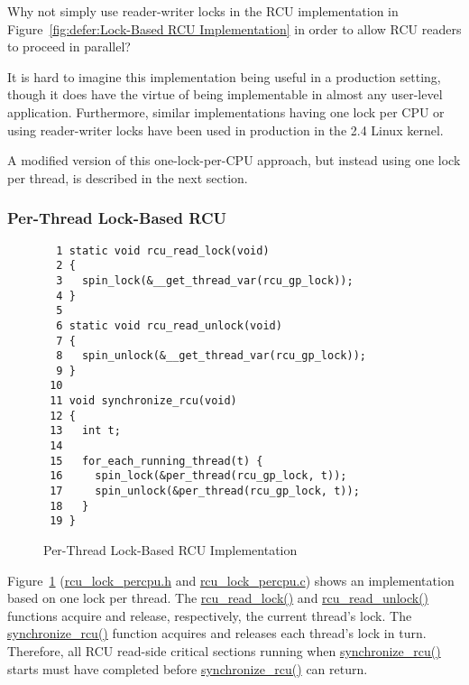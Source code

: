 \QuickQuiz{}
	Why not simply use reader-writer locks in the RCU implementation
	in
	Figure~\ref{fig:defer:Lock-Based RCU Implementation}
	in order to allow RCU readers to proceed in parallel?
 \QuickQuizEnd

It is hard to imagine this implementation being useful
in a production setting, though it does have the virtue
of being implementable in almost any user-level application.
Furthermore, similar implementations having one lock per CPU
or using reader-writer locks have been used in production
in the 2.4 Linux kernel.

A modified version of this one-lock-per-CPU approach, but instead using
one lock per thread, is described
in the next section.

\subsubsection{Per-Thread Lock-Based RCU}
\label{defer:Per-Thread Lock-Based RCU}

\begin{figure}[bp]
{ \scriptsize
\begin{verbatim}
  1 static void rcu_read_lock(void)
  2 {
  3   spin_lock(&__get_thread_var(rcu_gp_lock));
  4 }
  5
  6 static void rcu_read_unlock(void)
  7 {
  8   spin_unlock(&__get_thread_var(rcu_gp_lock));
  9 }
 10
 11 void synchronize_rcu(void)
 12 {
 13   int t;
 14
 15   for_each_running_thread(t) {
 16     spin_lock(&per_thread(rcu_gp_lock, t));
 17     spin_unlock(&per_thread(rcu_gp_lock, t));
 18   }
 19 }
\end{verbatim}
}
\caption{Per-Thread Lock-Based RCU Implementation}
\label{fig:defer:Per-Thread Lock-Based RCU Implementation}
\end{figure}

Figure~\ref{fig:defer:Per-Thread Lock-Based RCU Implementation}
(\url{rcu_lock_percpu.h} and \url{rcu_lock_percpu.c})
shows an implementation based on one lock per thread.
The \url{rcu_read_lock()} and \url{rcu_read_unlock()} functions
acquire and release, respectively, the current thread's lock.
The \url{synchronize_rcu()} function acquires and releases each thread's
lock in turn.
Therefore, all RCU read-side critical sections running
when \url{synchronize_rcu()} starts must have completed before
\url{synchronize_rcu()} can return.

